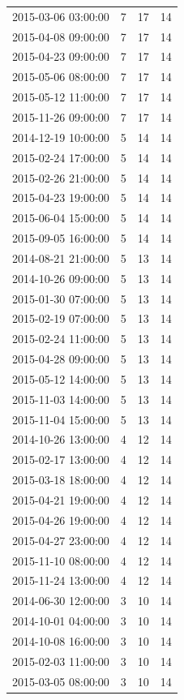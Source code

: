 \begin{tabular}{lrrr}
2015-03-06 03:00:00 & 7 & 17 & 14 \\
2015-04-08 09:00:00 & 7 & 17 & 14 \\
2015-04-23 09:00:00 & 7 & 17 & 14 \\
2015-05-06 08:00:00 & 7 & 17 & 14 \\
2015-05-12 11:00:00 & 7 & 17 & 14 \\
2015-11-26 09:00:00 & 7 & 17 & 14 \\
2014-12-19 10:00:00 & 5 & 14 & 14 \\
2015-02-24 17:00:00 & 5 & 14 & 14 \\
2015-02-26 21:00:00 & 5 & 14 & 14 \\
2015-04-23 19:00:00 & 5 & 14 & 14 \\
2015-06-04 15:00:00 & 5 & 14 & 14 \\
2015-09-05 16:00:00 & 5 & 14 & 14 \\
2014-08-21 21:00:00 & 5 & 13 & 14 \\
2014-10-26 09:00:00 & 5 & 13 & 14 \\
2015-01-30 07:00:00 & 5 & 13 & 14 \\
2015-02-19 07:00:00 & 5 & 13 & 14 \\
2015-02-24 11:00:00 & 5 & 13 & 14 \\
2015-04-28 09:00:00 & 5 & 13 & 14 \\
2015-05-12 14:00:00 & 5 & 13 & 14 \\
2015-11-03 14:00:00 & 5 & 13 & 14 \\
2015-11-04 15:00:00 & 5 & 13 & 14 \\
2014-10-26 13:00:00 & 4 & 12 & 14 \\
2015-02-17 13:00:00 & 4 & 12 & 14 \\
2015-03-18 18:00:00 & 4 & 12 & 14 \\
2015-04-21 19:00:00 & 4 & 12 & 14 \\
2015-04-26 19:00:00 & 4 & 12 & 14 \\
2015-04-27 23:00:00 & 4 & 12 & 14 \\
2015-11-10 08:00:00 & 4 & 12 & 14 \\
2015-11-24 13:00:00 & 4 & 12 & 14 \\
2014-06-30 12:00:00 & 3 & 10 & 14 \\
2014-10-01 04:00:00 & 3 & 10 & 14 \\
2014-10-08 16:00:00 & 3 & 10 & 14 \\
2015-02-03 11:00:00 & 3 & 10 & 14 \\
2015-03-05 08:00:00 & 3 & 10 & 14 \\

\end{tabular}
